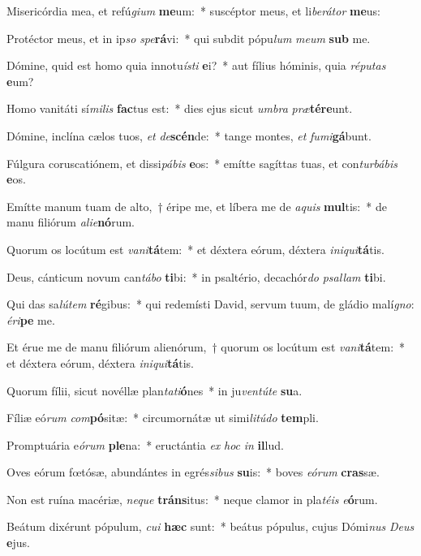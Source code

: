 \item Misericórdia mea, et refú\textit{gi}\textit{um} \textbf{me}um:~* suscéptor meus, et li\textit{be}\textit{rá}\textit{tor} \textbf{me}us:
\item Protéctor meus, et in ip\textit{so} \textit{spe}\textbf{rá}vi:~* qui subdit pópu\textit{lum} \textit{me}\textit{um} \textbf{sub} me.
\item Dómine, quid est homo quia innotu\textit{ís}\textit{ti} \textbf{e}i?~* aut fílius hóminis, quia \textit{ré}\textit{pu}\textit{tas} \textbf{e}um?
\item Homo vanitáti sí\textit{mi}\textit{lis} \textbf{fac}tus est:~* dies ejus sicut \textit{um}\textit{bra} \textit{præ}\textbf{tér}\textbf{e}unt.
\item Dómine, inclína cælos tuos, \textit{et} \textit{de}\textbf{scén}de:~* tange montes, \textit{et} \textit{fu}\textit{mi}\textbf{gá}bunt.
\item Fúlgura coruscatiónem, et dissi\textit{pá}\textit{bis} \textbf{e}os:~* emítte sagíttas tuas, et con\textit{tur}\textit{bá}\textit{bis} \textbf{e}os.
\item Emítte manum tuam de alto,~† éripe me, et líbera me de \textit{a}\textit{quis} \textbf{mul}tis:~* de manu filiórum \textit{a}\textit{li}\textit{e}\textbf{nó}rum.
\item Quorum os locútum est \textit{va}\textit{ni}\textbf{tá}tem:~* et déxtera eórum, déxtera \textit{in}\textit{i}\textit{qui}\textbf{tá}tis.
\item Deus, cánticum novum can\textit{tá}\textit{bo} \textbf{ti}bi:~* in psaltério, decachór\textit{do} \textit{psal}\textit{lam} \textbf{ti}bi.
\item Qui das sa\textit{lú}\textit{tem} \textbf{ré}gibus:~* qui redemísti David, servum tuum, de gládio malí\textit{gno}: \textit{é}\textit{ri}\textbf{pe} me.
\item Et érue me de manu filiórum alienórum,~† quorum os locútum est \textit{va}\textit{ni}\textbf{tá}tem:~* et déxtera eórum, déxtera \textit{in}\textit{i}\textit{qui}\textbf{tá}tis.
\item Quorum fílii, sicut novéllæ plan\textit{ta}\textit{ti}\textbf{ó}nes~* in ju\textit{ven}\textit{tú}\textit{te} \textbf{su}a.
\item Fíliæ eó\textit{rum} \textit{com}\textbf{pó}sitæ:~* circumornátæ ut simi\textit{li}\textit{tú}\textit{do} \textbf{tem}pli.
\item Promptuária e\textit{ó}\textit{rum} \textbf{ple}na:~* eructántia \textit{ex} \textit{hoc} \textit{in} \textbf{il}lud.
\item Oves eórum fœtósæ, abundántes in egrés\textit{si}\textit{bus} \textbf{su}is:~* boves \textit{e}\textit{ó}\textit{rum} \textbf{cras}sæ.
\item Non est ruína macériæ, \textit{ne}\textit{que} \textbf{tráns}itus:~* neque clamor in pla\textit{té}\textit{is} \textit{e}\textbf{ó}rum.
\item Beátum dixérunt pópulum, \textit{cu}\textit{i} \textbf{hæc} sunt:~* beátus pópulus, cujus Dómi\textit{nus} \textit{De}\textit{us} \textbf{e}jus.
